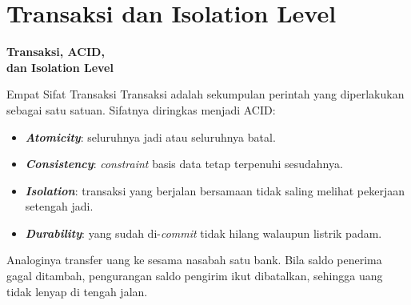 \documentclass[aspectratio=169, table, 12pt]{beamer}
\begin{document}
\section{Transaksi dan Isolation Level}

\begin{frame}{\hfill}
  \centering
  \Huge{\textbf{Transaksi, ACID,\\dan Isolation Level}}
\end{frame}

\begin{frame}{{\Large Empat Sifat Transaksi}}
  \vspace{8pt}
  Transaksi adalah sekumpulan perintah yang diperlakukan sebagai satu satuan.
  Sifatnya diringkas menjadi ACID:
  \vspace{2pt}
  \begin{itemize}
    \item \textbf{\textit{Atomicity}}: seluruhnya jadi atau seluruhnya batal.
    \item \textbf{\textit{Consistency}}: \textit{constraint} basis data tetap terpenuhi
          sesudahnya.
    \item \textbf{\textit{Isolation}}: transaksi yang berjalan bersamaan tidak
          saling melihat pekerjaan setengah jadi.
    \item \textbf{\textit{Durability}}: yang sudah di-\textit{commit} tidak
          hilang walaupun listrik padam.
  \end{itemize}
  \vspace{4pt}
  {\footnotesize Analoginya transfer uang ke sesama nasabah satu bank. Bila
  saldo penerima gagal ditambah, pengurangan saldo pengirim ikut dibatalkan,
  sehingga uang tidak lenyap di tengah jalan.}
\end{frame}
\end{document}
